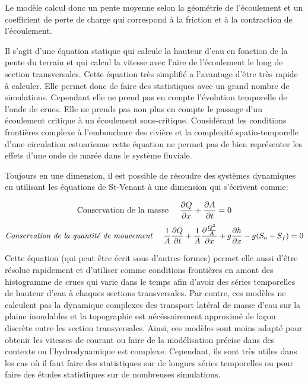 \documentclass[12pt]{article}   %
\begin{document}
    Le modèle calcul donc un pente moyenne selon la géométrie de l'écoulement et un coefficient de perte de charge qui correspond à la friction et à la contraction de l'écoulement. 
    
    Il s'agit d'une équation statique qui calcule la hauteur d'eau en fonction de la pente du terrain et qui calcul la vitesse avec l'aire de l'écoulement le long de section transversales. Cette équation très simplifié a l'avantage d'être très rapide à calculer. Elle permet donc de faire des statistiques avec un grand nombre de simulations. Cependant elle ne prend pas en compte l'évolution temporelle de l'onde de crues. Elle ne prends pas non plus en compte le passage d'un écoulement critique à un écoulement sous-critique. Considérant les conditions frontières complexe à l'embouchure des rivière et la complexité spatio-temporelle d'une circulation estuarienne cette équation ne permet pas de bien représenter les effets d'une onde de marée dans le système fluviale.
    
    Toujours en une dimension, il est possible de résoudre des systèmes dynamiques en utilisant les équations de St-Venant à une dimension qui s'écrivent comme:
    
    \begin{align}
       \text{Conservation de la masse \quad}  \dfrac{\partial Q}{\partial x} + \dfrac{\partial A}{\partial t} = 0 
    \end{align}
    \begin{align}
       \textit{Conservation de la quantité de mouvement \quad}  \frac{1}{A}\frac{\partial Q}{\partial t} + \frac{1}{A}\frac{ \partial \frac{Q^2}{A}}{\partial x} + g \frac{\partial h }{\partial x} - g(S_o - S_f) = 0 
       \label{stevnant}
    \end{align}
    
    Cette équation (qui peut être écrit sous d'autres formes) permet elle aussi d'être résolue rapidement et d'utiliser comme conditions frontières en amont des histogramme de crues qui varie dans le temps afin d'avoir des séries temporelles de hauteur d'eau à chaques sections transversales. Par contre, ces modèles ne calculent pas la dynamique complexes des transport latéral de masse d'eau sur la plaine inondables et la topographie est nécéssairement approximé de façon discrète entre les section transversales. Ainsi, ces modèles sont moins adapté pour obtenir les vitesses de courant ou faire de la modélisation précise dans des contexte ou l'hydrodynamique est complexe. Cependant, ils sont très utiles dans les cas où il faut faire des statistiques sur de longues séries temporelles ou pour faire des études statistiques sur de nombreuses simulations. 
    
\end{document}
